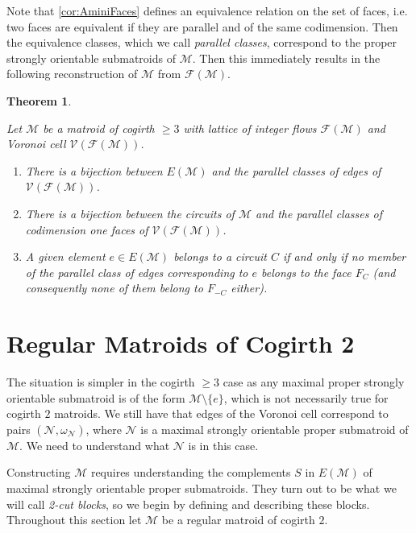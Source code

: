 \documentclass[12pt]{report}
\newtheorem{theorem}{Theorem}[chapter]
\theoremstyle{definition}
\def\calF{\mathcal F}
\def\calM{\mathcal M}
\def\calN{\mathcal N}
\def\calV{\mathcal V}
\theoremstyle{upright}
\begin{document}
Note that \cref{cor:AminiFaces} defines an equivalence relation on the set of faces, i.e. two faces are equivalent if they are parallel and of the same codimension.
Then the equivalence classes, which we call \textit{parallel classes}, correspond to the proper strongly orientable submatroids of $\calM$.
Then this immediately results in the following reconstruction of $\calM$ from $\calF(\calM)$.

\begin{theorem}\label{thm:3ConnectedReconstruction}

    Let $\calM$ be a matroid of cogirth $\geq3$ with lattice of integer flows $\calF(\calM)$ and Voronoi cell $\calV(\calF(\calM))$.

    \begin{enumerate}
        \item There is a bijection between $E(\calM)$ and the parallel classes of edges of $\calV(\calF(\calM))$.
        \item There is a bijection between the circuits of $\calM$ and the parallel classes of codimension one faces of $\calV(\calF(\calM))$.
        \item A given element $e\in E(\calM)$ belongs to a circuit $C$ if and only if no member of the parallel class of edges corresponding to $e$ belongs to the face $F_C$ (and consequently none of them belong to $F_{-C}$ either).
    \end{enumerate}
    
\end{theorem}

\section{Regular Matroids of Cogirth 2}
\label{sec:Cogirth2}

The situation is simpler in the cogirth $\geq3$ case as any maximal proper strongly orientable submatroid is of the form $\calM\setminus\{e\}$, which is not necessarily true for cogirth $2$ matroids.
We still have that edges of the Voronoi cell correspond to pairs $(\calN, \omega_\calN)$, where $\calN$ is a maximal strongly orientable proper submatroid of $\calM$.
We need to understand what $\calN$ is in this case.

Constructing $\calM$ requires understanding the complements $S$ in $E(\calM)$ of maximal strongly orientable proper submatroids.
They turn out to be what we will call \textit{2-cut blocks}, so we begin by defining and describing these blocks.
Throughout this section let $\calM$ be a regular matroid of cogirth $2$.
\end{document}
